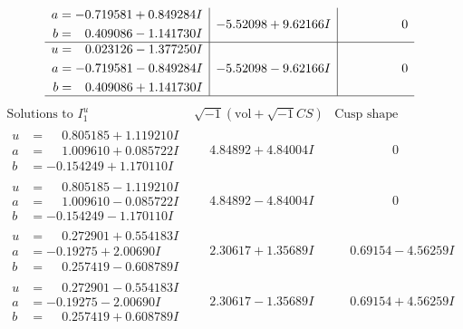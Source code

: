 \documentclass[1p]{elsarticle_modified}
\theoremstyle{definition}
\newcommand{\I}{\sqrt{-1}}
\begin{document}
$$\begin{array}{c|c|c}
\begin{aligned}
a &= -0.719581 + 0.849284 I \\
b &= \phantom{-}0.409086 - 1.141730 I\end{aligned}
 & -5.52098 + 9.62166 I & \phantom{-0.000000 } 0 \\ \hline\begin{aligned}
u &= \phantom{-}0.023126 - 1.377250 I \\
a &= -0.719581 - 0.849284 I \\
b &= \phantom{-}0.409086 + 1.141730 I\end{aligned}
 & -5.52098 - 9.62166 I & \phantom{-0.000000 } 0\\
 \hline 
 \end{array}$$\newpage$$\begin{array}{c|c|c}  
\text{Solutions to }I^u_{1}& \I (\text{vol} + \sqrt{-1}CS) & \text{Cusp shape}\\
 \hline 
\begin{aligned}
u &= \phantom{-}0.805185 + 1.119210 I \\
a &= \phantom{-}1.009610 + 0.085722 I \\
b &= -0.154249 + 1.170110 I\end{aligned}
 & \phantom{-}4.84892 + 4.84004 I & \phantom{-0.000000 } 0 \\ \hline\begin{aligned}
u &= \phantom{-}0.805185 - 1.119210 I \\
a &= \phantom{-}1.009610 - 0.085722 I \\
b &= -0.154249 - 1.170110 I\end{aligned}
 & \phantom{-}4.84892 - 4.84004 I & \phantom{-0.000000 } 0 \\ \hline\begin{aligned}
u &= \phantom{-}0.272901 + 0.554183 I \\
a &= -0.19275 + 2.00690 I \\
b &= \phantom{-}0.257419 - 0.608789 I\end{aligned}
 & \phantom{-}2.30617 + 1.35689 I & \phantom{-}0.69154 - 4.56259 I \\ \hline\begin{aligned}
u &= \phantom{-}0.272901 - 0.554183 I \\
a &= -0.19275 - 2.00690 I \\
b &= \phantom{-}0.257419 + 0.608789 I\end{aligned}
 & \phantom{-}2.30617 - 1.35689 I & \phantom{-}0.69154 + 4.56259 I \\ \hline\begin{aligned}

\end{aligned}
\end{array}$$
\end{document}

